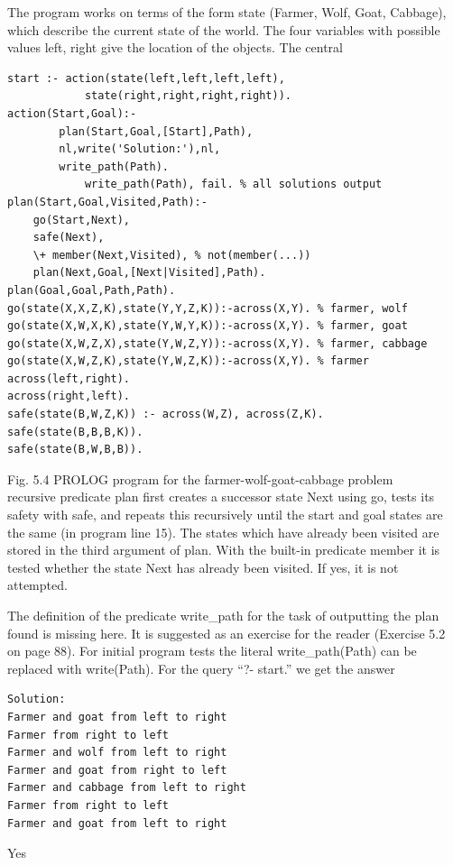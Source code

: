 \documentclass[10pt]{book}
\begin{document}
The program works on terms of the form state (Farmer, Wolf, Goat, Cabbage), which describe the current state of the world. The four variables with possible values left, right give the location of the objects. The central

\begin{verbatim}
start :- action(state(left,left,left,left),
            state(right,right,right,right)).
action(Start,Goal):-
        plan(Start,Goal,[Start],Path),
        nl,write('Solution:'),nl,
        write_path(Path).
            write_path(Path), fail. % all solutions output
plan(Start,Goal,Visited,Path):-
    go(Start,Next),
    safe(Next),
    \+ member(Next,Visited), % not(member(...))
    plan(Next,Goal,[Next|Visited],Path).
plan(Goal,Goal,Path,Path).
go(state(X,X,Z,K),state(Y,Y,Z,K)):-across(X,Y). % farmer, wolf
go(state(X,W,X,K),state(Y,W,Y,K)):-across(X,Y). % farmer, goat
go(state(X,W,Z,X),state(Y,W,Z,Y)):-across(X,Y). % farmer, cabbage
go(state(X,W,Z,K),state(Y,W,Z,K)):-across(X,Y). % farmer
across(left,right).
across(right,left).
safe(state(B,W,Z,K)) :- across(W,Z), across(Z,K).
safe(state(B,B,B,K)).
safe(state(B,W,B,B)).
\end{verbatim}

Fig. 5.4 PROLOG program for the farmer-wolf-goat-cabbage problem\\
recursive predicate plan first creates a successor state Next using go, tests its safety with safe, and repeats this recursively until the start and goal states are the same (in program line 15). The states which have already been visited are stored in the third argument of plan. With the built-in predicate member it is tested whether the state Next has already been visited. If yes, it is not attempted.

The definition of the predicate write\_path for the task of outputting the plan found is missing here. It is suggested as an exercise for the reader (Exercise 5.2 on page 88). For initial program tests the literal write\_path(Path) can be replaced with write(Path). For the query ``?- start.'' we get the answer

\begin{verbatim}
Solution:
Farmer and goat from left to right
Farmer from right to left
Farmer and wolf from left to right
Farmer and goat from right to left
Farmer and cabbage from left to right
Farmer from right to left
Farmer and goat from left to right
\end{verbatim}

Yes
\end{document}
